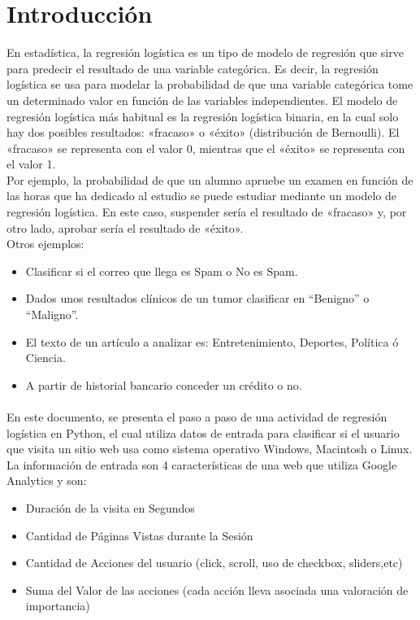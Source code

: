 \documentclass{article}
\begin{document}
\section{Introducción}
En estadística, la regresión logística es un tipo de modelo de regresión que sirve para predecir el resultado de una variable categórica. Es decir, la regresión logística se usa para modelar la probabilidad de que una variable categórica tome un determinado valor en función de las variables independientes.
El modelo de regresión logística más habitual es la regresión logística binaria, en la cual solo hay dos posibles resultados: «fracaso» o «éxito» (distribución de Bernoulli). El «fracaso» se representa con el valor 0, mientras que el «éxito» se representa con el valor 1.\\

Por ejemplo, la probabilidad de que un alumno apruebe un examen en función de las horas que ha dedicado al estudio se puede estudiar mediante un modelo de regresión logística. En este caso, suspender sería el resultado de «fracaso» y, por otro lado, aprobar sería el resultado de «éxito».\\

Otros ejemplos:
\begin{itemize}
    \item Clasificar si el correo que llega es Spam o No es Spam.
    \item Dados unos resultados clínicos de un tumor clasificar en “Benigno” o “Maligno”.
    \item El texto de un artículo a analizar es: Entretenimiento, Deportes, Política ó Ciencia.
    \item A partir de historial bancario conceder un crédito o no.
\end{itemize}

\paragraph{}En este documento, se presenta el paso a paso de una actividad de regresión logística en Python, el cual utiliza datos de entrada para clasificar si el usuario que visita un sitio web usa como sistema operativo Windows, Macintosh o Linux. La información de entrada son 4 características de una web que utiliza Google Analytics y son:
\begin{itemize}
    \item Duración de la visita en Segundos
    \item Cantidad de Páginas Vistas durante la Sesión
    \item Cantidad de Acciones del usuario (click, scroll, uso de checkbox, sliders,etc)
    \item Suma del Valor de las acciones (cada acción lleva asociada una valoración de importancia)
\end{itemize}
\end{document}
